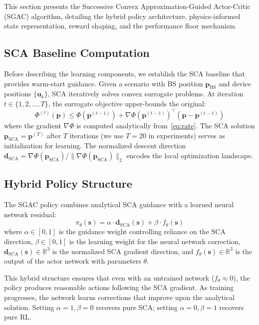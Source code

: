 \documentclass[journal]{IEEEtran}
\begin{document}
This section presents the Successive Convex Approximation-Guided Actor-Critic (SGAC) algorithm, detailing the hybrid policy architecture, physics-informed state representation, reward shaping, and the performance floor mechanism.

\subsection{SCA Baseline Computation}

Before describing the learning components, we establish the SCA baseline that provides warm-start guidance. Given a scenario with BS position $\mathbf{p}_{\text{BS}}$ and device positions $\{\mathbf{u}_k\}$, SCA iteratively solves convex surrogate problems. At iteration $t \in \{1, 2, \ldots, T\}$, the surrogate objective upper-bounds the original:
\begin{equation}
\Phi^{(t)}(\mathbf{p}) \leq \Phi(\mathbf{p}^{(t-1)}) + \nabla\Phi(\mathbf{p}^{(t-1)})^\top (\mathbf{p} - \mathbf{p}^{(t-1)})
\label{eq:sca_surrogate}
\end{equation}
where the gradient $\nabla\Phi$ is computed analytically from~\eqref{eq:rate}. The SCA solution $\mathbf{p}_{\text{SCA}} = \mathbf{p}^{(T)}$ after $T$ iterations (we use $T=20$ in experiments) serves as initialization for learning. The normalized descent direction $\mathbf{d}_{\text{SCA}} = \nabla\Phi(\mathbf{p}_{\text{SCA}})/\|\nabla\Phi(\mathbf{p}_{\text{SCA}})\|_2$ encodes the local optimization landscape.

\subsection{Hybrid Policy Structure}

The SGAC policy combines analytical SCA guidance with a learned neural network residual:
\begin{equation}
\pi_\theta(\mathbf{s}) = \alpha \cdot \mathbf{d}_{\text{SCA}}(\mathbf{s}) + \beta \cdot f_\theta(\mathbf{s})
\label{eq:policy}
\end{equation}
where $\alpha \in [0, 1]$ is the guidance weight controlling reliance on the SCA direction, $\beta \in [0, 1]$ is the learning weight for the neural network correction, $\mathbf{d}_{\text{SCA}}(\mathbf{s}) \in \mathbb{R}^3$ is the normalized SCA gradient direction, and $f_\theta(\mathbf{s}) \in \mathbb{R}^3$ is the output of the actor network with parameters $\theta$.

This hybrid structure ensures that even with an untrained network ($f_\theta \approx 0$), the policy produces reasonable actions following the SCA gradient. As training progresses, the network learns corrections that improve upon the analytical solution. Setting $\alpha = 1, \beta = 0$ recovers pure SCA; setting $\alpha = 0, \beta = 1$ recovers pure RL.
\end{document}
